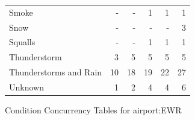 \documentclass[11pt]{scrartcl}
\begin{document}
\begin{tabular}{lrrrrr}
Smoke                        &  - &  - &    1 &    1 &    1 \\
Snow                         &  - &  - &  - &  - &    3 \\
Squalls                      &  - &  - &    1 &    1 &    1 \\
Thunderstorm                 &    3 &    5 &    5 &    5 &    5 \\
Thunderstorms and Rain       &   10 &   18 &   19 &   22 &   27 \\
Unknown                      &    1 &    2 &    4 &    4 &    6 \\
\bottomrule
\end{tabular}


Condition Concurrency Tables for airport:EWR

\end{document}
